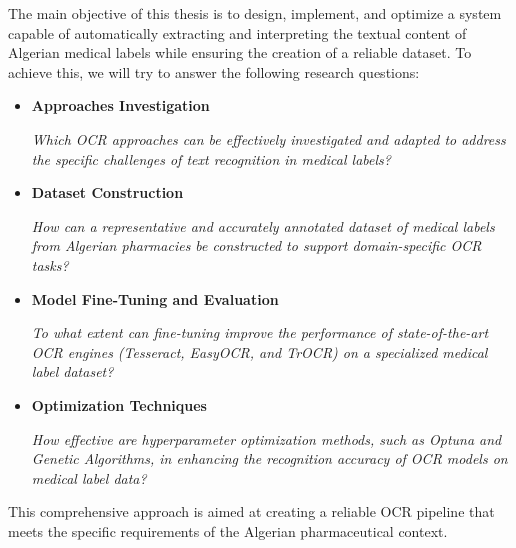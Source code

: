 The main objective of this thesis is to design, implement, and optimize a system capable of automatically extracting and interpreting the textual content of Algerian medical labels while ensuring the creation of a reliable dataset. To achieve this, we will try to answer the following research questions:
\begin{itemize}

    \item \textbf{Approaches Investigation}
    
\textit{Which OCR approaches can be effectively investigated and adapted to address the specific challenges of text recognition in medical labels?}

    \item \textbf{Dataset Construction}
    
\textit{How can a representative and accurately annotated dataset of medical labels from Algerian pharmacies be constructed to support domain-specific OCR tasks?}
    
    \item \textbf{Model Fine-Tuning and Evaluation}
    
\textit{To what extent can fine-tuning improve the performance of state-of-the-art OCR engines (Tesseract, EasyOCR, and TrOCR) on a specialized medical label dataset?}

    \item \textbf{Optimization Techniques}
    
\textit{How effective are hyperparameter optimization methods, such as Optuna and Genetic Algorithms, in enhancing the recognition accuracy of OCR models on medical label data?}
\end{itemize}

This comprehensive approach is aimed at creating a reliable OCR pipeline that meets the specific requirements of the Algerian pharmaceutical context.

